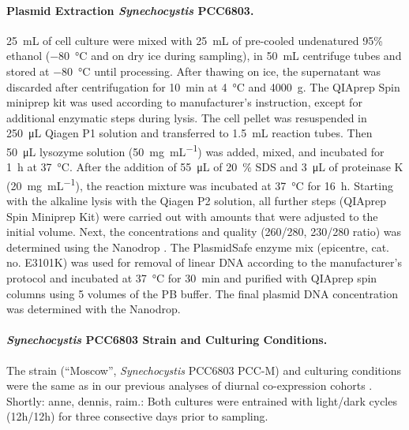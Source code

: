 \documentclass[10pt,letterpaper]{article}
\newcommand{\mL}{\milli\liter}
\newcommand{\scyst}{\textit{Synechocystis} PCC6803}
\newcommand{\raim}[1]{\begingroup{\color{purple}#1}\endgroup}
\begin{document}
\paragraph{Plasmid Extraction \scyst{}.}
\SI{25}{\mL} of cell culture were mixed with \SI{25}{\mL} of
pre-cooled undenatured 95\% ethanol (\SI{-80}{\celsius} and on dry ice
during sampling), in \SI{50}{\mL} centrifuge tubes and stored at
\SI{-80}{\celsius} until processing. After thawing on ice, the
supernatant was discarded after centrifugation for \SI{10}{\minute} at
\SI{4}{\celsius} and \SI{4000}{g}. The QIAprep Spin miniprep kit was
used according to manufacturer's instruction, except for additional
enzymatic steps during lysis. The cell pellet was resuspended in
\SI{250}{\micro\liter} Qiagen P1 solution and transferred to
\SI{1.5}{\mL} reaction tubes. Then \SI{50}{\micro\liter} lysozyme 
solution (\SI{50}{\milli\gram\per\milli\liter}) was added, mixed, and
incubated for \SI{1}{\hour} at \SI{37}{\celsius}.  After the addition
of \SI{55}{\micro\liter} of \SI{20}{\percent} SDS and
\SI{3}{\micro\liter} of proteinase K
(\SI{20}{\milli\gram\per\milli\liter}), the reaction mixture was
incubated at \SI{37}{\celsius} for \SI{16}{\hour}.  Starting with the
alkaline lysis with the Qiagen P2 solution, all further steps
(QIAprep Spin Miniprep Kit) were carried out with
amounts that were adjusted to the initial volume. Next, the
concentrations and quality (260/280, 230/280 ratio) was determined
using the Nanodrop  .  The PlasmidSafe enzyme mix (epicentre,
cat. no. E3101K) was used for removal of linear DNA according to the
manufacturer's protocol and incubated at \SI{37}{\celsius} for
\SI{30}{\minute} and purified with QIAprep spin columns using 5
volumes of the PB buffer. The final plasmid DNA concentration was
determined with the Nanodrop.

\paragraph{\scyst{} Strain and Culturing Conditions.}



The strain (``Moscow'', \scyst{} PCC-M) and culturing conditions were
the same as in our previous analyses of diurnal co-expression cohorts
\cite{Lehmann2013, Beck2014}. Shortly: \raim{anne, dennis, raim.:
Both cultures were entrained with light/dark cycles (12h/12h) for
three consective days prior to sampling.}
\end{document}
